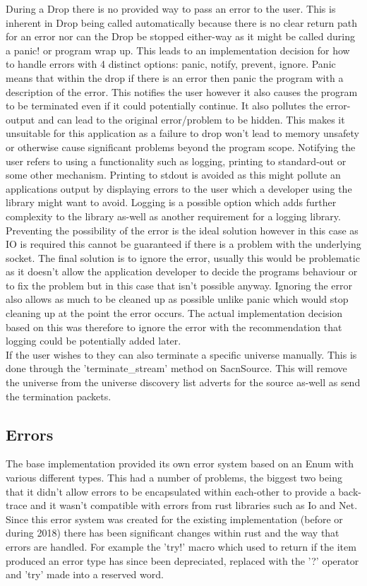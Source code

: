 \documentclass[11pt,a4paper]{article}
\begin{document}
During a Drop there is no provided way to pass an error to the user. This is inherent in Drop being called automatically because there is no clear return path for an error nor can the Drop be stopped either-way as it might be called during a panic! or program wrap up. This leads to an implementation decision for how to handle errors with 4 distinct options: panic, notify, prevent, ignore. Panic means that within the drop if there is an error then panic the program with a description of the error. This notifies the user however it also causes the program to be terminated even if it could potentially continue. It also pollutes the error-output and can lead to the original error/problem to be hidden. This makes it unsuitable for this application as a failure to drop won't lead to memory unsafety or otherwise cause significant problems beyond the program scope. Notifying the user refers to using a functionality such as logging, printing to standard-out or some other mechanism. Printing to stdout is avoided as this might pollute an applications output by displaying errors to the user which a developer using the library might want to avoid. Logging is a possible option which adds further complexity to the library as-well as another requirement for a logging library. Preventing the possibility of the error is the ideal solution however in this case as IO is required this cannot be guaranteed if there is a problem with the underlying socket. The final solution is to ignore the error, usually this would be problematic as it doesn't allow the application developer to decide the programs behaviour or to fix the problem but in this case that isn't possible anyway. Ignoring the error also allows as much to be cleaned up as possible unlike panic which would stop cleaning up at the point the error occurs. The actual implementation decision based on this was therefore to ignore the error with the recommendation that logging could be potentially added later.\\

If the user wishes to they can also terminate a specific universe manually. This is done through the 'terminate\_stream' method on SacnSource. This will remove the universe from the universe discovery list adverts for the source as-well as send the termination packets.

\subsection{Errors}
The base implementation provided its own error system based on an Enum with various different types. This had a number of problems, the biggest two being that it didn't allow errors to be encapsulated within each-other to provide a back-trace and it wasn't compatible with errors from rust libraries such as Io and Net. Since this error system was created for the existing implementation (before or during 2018) there has been significant changes within rust and the way that errors are handled. For example the 'try!' \cite{RUST_TRY} macro which used to return if the item produced an error type has since been depreciated, replaced with the '?' operator and 'try' made into a reserved word.\\
\end{document}
